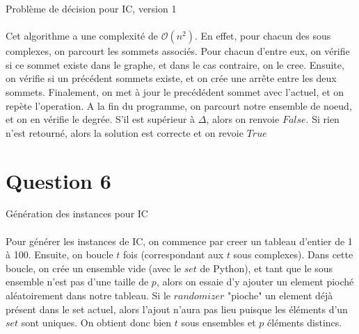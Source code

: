 \documentclass[11pt]{article}
\begin{document}
\begin{algorithm}[H]
\SetAlgoLined
{}
	\caption{Problème de décision pour IC, version 1}
\end{algorithm}
\paragraph{}
Cet algorithme a une complexité de $\mathcal{O}(n^2)$. 
En effet, pour chacun des sous complexes, on parcourt les sommets associés.
Pour chacun d'entre eux, on vérifie si ce sommet existe dans le graphe, et dans le cas contraire, on le cree.
Ensuite, on vérifie si un précédent sommets existe, et on crée une arrête entre les deux sommets.
Finalement, on met à jour le precédédent sommet avec l'actuel, et on repète l'operation.
A la fin du programme, on parcourt notre ensemble de noeud, et on en vérifie le degrée. S'il est 
supérieur à $\Delta$, alors on renvoie $False$. Si rien n'est retourné, alors la solution est correcte et on revoie $True$

\section{Question 6}

\begin{algorithm}[H]
\SetAlgoLined
{}
	\caption{Génération des instances pour IC}
\end{algorithm}
\paragraph{}
Pour générer les instances de IC, on commence par creer un tableau d'entier de 1 à 100.
Ensuite, on boucle $t$ fois (correspondant aux $t$ sous complexes). 
Dans cette boucle, on crée un ensemble vide (avec le $set$ de Python), et tant que le sous ensemble n'est 
pas d'une taille de $p$, alors on essaie d'y ajouter un element pioché aléatoirement dans notre tableau.
Si le $randomizer$ "pioche" un element déjà présent dans le set actuel, alors l'ajout n'aura pas lieu 
puisque les éléments d'un $set$ sont uniques. On obtient donc bien $t$ sous ensembles et $p$ éléments distincs.
\end{document}
